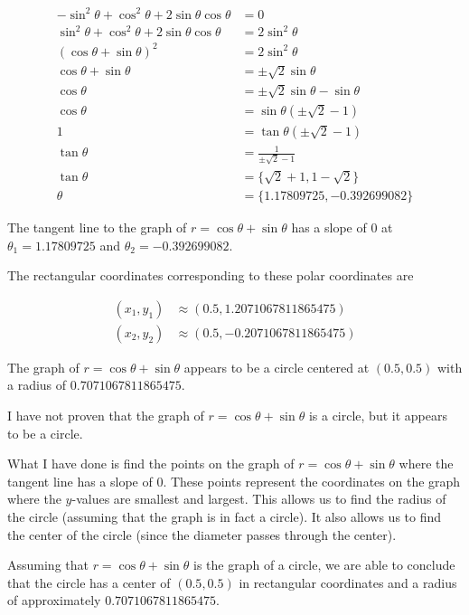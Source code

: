 \begin{align*}
-\sin^2 \theta + \cos^2 \theta + 2 \sin \theta \cos \theta &= 0 \\
\sin^2 \theta + \cos^2 \theta + 2 \sin \theta \cos \theta &= 2 \sin^2 \theta \\
\left( \cos \theta + \sin \theta \right)^2 &= 2 \sin^2 \theta \\
\cos \theta + \sin \theta &= \pm \sqrt 2 \sin \theta \\
\cos \theta &= \pm \sqrt 2 \sin \theta - \sin \theta \\
\cos \theta &= \sin \theta \left( \pm \sqrt 2 - 1 \right) \\
1 &= \tan \theta \left( \pm \sqrt 2 - 1 \right) \\
\tan \theta &= \frac{1}{\pm \sqrt 2 - 1} \\
\tan \theta &= \Bigg\{ \sqrt{2} + 1, 1 - \sqrt 2 \Bigg\} \\
\theta &= \Bigg\{ 1.17809725, -0.392699082 \Bigg\}
\end{align*}

The tangent line to the graph of $r = \cos \theta + \sin \theta$ has a slope of $0$ at $\theta_1 = 1.17809725$ and $\theta_2 = -0.392699082$.

The rectangular coordinates corresponding to these polar coordinates are

\begin{align*}
(x_1, y_1) &\approx (0.5, 1.2071067811865475) \\
(x_2, y_2) &\approx (0.5, -0.2071067811865475)
\end{align*}

The graph of $r = \cos \theta + \sin \theta$ appears to be a circle centered at $(0.5, 0.5)$ with a radius of $0.7071067811865475$.

I have not proven that the graph of $r = \cos \theta + \sin \theta$ is a circle, but it appears to be a circle.

What I have done is find the points on the graph of $r = \cos \theta + \sin \theta$ where the tangent line has a slope of 0. These points represent the coordinates on the graph where the $y$-values are smallest and largest. This allows us to find the radius of the circle (assuming that the graph is in fact a circle). It also allows us to find the center of the circle (since the diameter passes through the center).

Assuming that $r = \cos \theta + \sin \theta$ is the graph of a circle, we are able to conclude that the circle has a center of $(0.5, 0.5)$ in rectangular coordinates and a radius of approximately $0.7071067811865475$.
